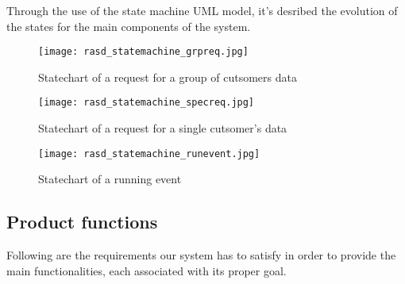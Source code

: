 \documentclass[../main.tex]{subfiles}
\begin{document}
Through the use of the state machine UML model, it's desribed the evolution of the states for the main components of the system.

\begin{figure}[H]
	\texttt{[image: rasd\_statemachine\_grpreq.jpg]}
	\caption{Statechart of a request for a group of cutsomers data}
	\label{fig:statemachine_grpreq}
\end{figure}

\begin{figure}[H]
	\texttt{[image: rasd\_statemachine\_specreq.jpg]}
	\caption{Statechart of a request for a single cutsomer's data}
	\label{fig:statemachine_specreq}
\end{figure}

\begin{figure}[H]
	\texttt{[image: rasd\_statemachine\_runevent.jpg]}
	\caption{Statechart of a running event}
	\label{fig:statemachine_runevent}
\end{figure}

\subsection{Product functions}

Following are the requirements our system has to satisfy in order to provide the main functionalities, each associated with its proper goal.
\end{document}
